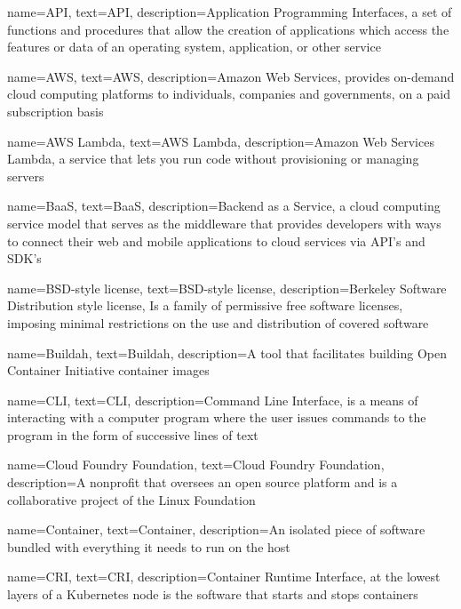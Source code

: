 {
    name={API},
    text={API},
    description={Application Programming Interfaces, a set of functions and procedures that allow the creation of applications which access the features or data of an operating system, application, or other service}
}

{
    name={AWS},
    text={AWS},
    description={Amazon Web Services,  provides on-demand cloud computing platforms to individuals, companies and governments, on a paid subscription basis}
}


{
    name={AWS Lambda},
    text={AWS Lambda},
    description={Amazon Web Services Lambda, a service that lets you run code without provisioning or managing servers}
}

{
    name={BaaS},
    text={BaaS},
    description={Backend as a Service, a cloud computing service model that serves as the middleware that provides developers with ways to connect their web and mobile applications to cloud services via \gls{API}'s and \gls{SDK}'s}
}

{
    name={BSD-style license},
    text={BSD-style license},
    description={Berkeley Software Distribution style license, Is a family of permissive free software licenses, imposing minimal restrictions on the use and distribution of covered software}
}

{
    name={Buildah},
    text={Buildah},
    description={A tool that facilitates building Open Container Initiative container images}
}

{
    name={CLI},
    text={CLI},
    description={Command Line Interface, is a means of interacting with a computer program where the user issues commands to the program in the form of successive lines of text}
}

{
    name={Cloud Foundry Foundation},
    text={Cloud Foundry Foundation},
    description={A nonprofit that oversees an open source platform and is a collaborative project of the Linux Foundation}
}

{
    name={Container},
    text={Container},
    description={An isolated piece of software bundled with everything it needs to run on the host}
}

{
    name={CRI},
    text={CRI},
    description={Container Runtime Interface, at the lowest layers of a Kubernetes node is the software that starts and stops containers}
}

